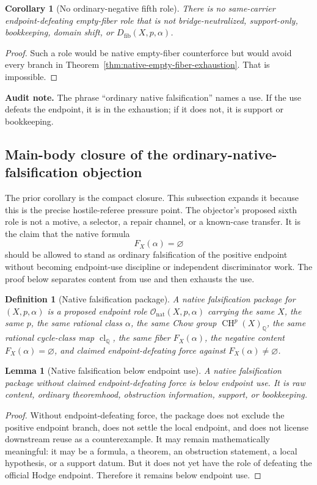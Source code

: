 \documentclass[11pt]{article}
\newtheorem{lemma}[theorem]{Lemma}
\newtheorem{corollary}[theorem]{Corollary}
\newtheorem{definition}[theorem]{Definition}
\newcommand{\QQ}{\mathbb{Q}}
\newcommand{\CH}{\operatorname{CH}}
\newcommand{\clQ}{\operatorname{cl}_{\QQ}}
\begin{document}
\begin{corollary}[No ordinary-negative fifth role]
There is no same-carrier endpoint-defeating empty-fiber role that is not bridge-neutralized, support-only, bookkeeping, domain shift, or $D_{\mathrm{fib}}(X,p,\alpha)$.
\end{corollary}
\begin{proof}
Such a role would be native empty-fiber counterforce but would avoid every branch in Theorem~\ref{thm:native-empty-fiber-exhaustion}.  That is impossible.
\end{proof}
\par\noindent\textbf{Audit note.} The phrase ``ordinary native falsification'' names a use.  If the use defeats the endpoint, it is in the exhaustion; if it does not, it is support or bookkeeping.

\subsection*{Main-body closure of the ordinary-native-falsification objection}

The prior corollary is the compact closure. This subsection expands it because this is the precise hostile-referee pressure point. The objector's proposed sixth role is not a motive, a selector, a repair channel, or a known-case transfer. It is the claim that the native formula
\[
F_X(\alpha)=\varnothing
\]
should be allowed to stand as ordinary falsification of the positive endpoint without becoming endpoint-use discipline or independent discriminator work. The proof below separates content from use and then exhausts the use.

\begin{definition}[Native falsification package]
A native falsification package for $(X,p,\alpha)$ is a proposed endpoint role $\mathcal O_{\mathrm{nat}}(X,p,\alpha)$ carrying the same $X$, the same $p$, the same rational class $\alpha$, the same Chow group $\CH^p(X)_\QQ$, the same rational cycle-class map $\clQ$, the same fiber $F_X(\alpha)$, the negative content $F_X(\alpha)=\varnothing$, and claimed endpoint-defeating force against $F_X(\alpha)\neq\varnothing$.
\end{definition}

\begin{lemma}[Native falsification below endpoint use]
A native falsification package without claimed endpoint-defeating force is below endpoint use. It is raw content, ordinary theoremhood, obstruction information, support, or bookkeeping.
\end{lemma}
\begin{proof}
Without endpoint-defeating force, the package does not exclude the positive endpoint branch, does not settle the local endpoint, and does not license downstream reuse as a counterexample. It may remain mathematically meaningful: it may be a formula, a theorem, an obstruction statement, a local hypothesis, or a support datum. But it does not yet have the role of defeating the official Hodge endpoint. Therefore it remains below endpoint use.
\end{proof}
\end{document}
